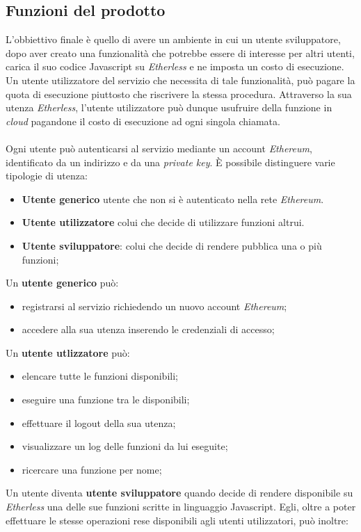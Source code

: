 \subsection{Funzioni del prodotto}
L'obbiettivo finale è quello di avere un ambiente in cui un utente sviluppatore, dopo aver creato una funzionalità che potrebbe essere di interesse per altri utenti, carica il suo codice Javascript su \textit{Etherless} e ne imposta un costo di esecuzione. Un utente utilizzatore del servizio che necessita di tale funzionalità, può pagare la quota di esecuzione piuttosto che riscrivere la stessa procedura. Attraverso la sua utenza \textit{Etherless}, l'utente utilizzatore può dunque usufruire della funzione in \textit{cloud\glo} pagandone il costo di esecuzione ad ogni singola chiamata.
\\\\
Ogni utente può autenticarsi al servizio mediante un account \textit{Ethereum\glo}, identificato da un indirizzo e da una \textit{private key\glos}. È possibile distinguere varie tipologie di utenza:
\begin{itemize}
	\item \textbf{Utente generico} utente che non si è autenticato nella rete \textit{Ethereum\glos}.
	\item \textbf{Utente utilizzatore} colui che decide di utilizzare funzioni altrui.
	\item \textbf{Utente sviluppatore}: colui che decide di rendere pubblica una o più funzioni;
\end{itemize} 
Un \textbf{utente generico} può:
\begin{itemize}
	\item registrarsi al servizio richiedendo un nuovo account \textit{Ethereum};
	\item accedere alla sua utenza inserendo le credenziali di accesso;
\end{itemize}
Un \textbf{utente utlizzatore} può:
\begin{itemize}
	\item elencare tutte le funzioni disponibili;
	\item eseguire una funzione tra le disponibili;
	\item effettuare il logout della sua utenza;
	\item visualizzare un log delle funzioni da lui eseguite;
	\item ricercare una funzione per nome;
\end{itemize}
Un utente diventa \textbf{utente sviluppatore} quando decide di rendere disponibile su \textit{Etherless} una delle sue funzioni scritte in linguaggio Javascript. Egli, oltre a poter effettuare le stesse operazioni rese disponibili agli utenti utilizzatori, può inoltre:
